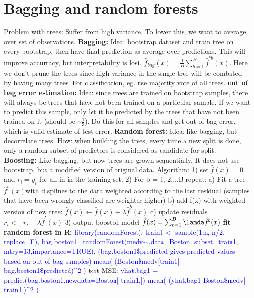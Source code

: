 \section{Bagging and random forests}
Problem with trees: Suffer from high variance. To lower this, we want to average over set of observations. 
\textbf{Bagging: } Idea: bootstrap dataset and train tree on every bootstrap, then have final prediction as average over predictions. This will improve accurracy, but interpretability is lost. $\hat f_{bag}(x)= \frac{1}{B} \sum_{b=1}^B \hat f^{*b}(x)$. Here we don't prune the trees since high variance in the single tree will be combated by having many trees. For classification, eg. use majority vote of all trees.
\textbf{out of bag error estimation: } Idea: since trees are trained on bootstrap samples, there will always be trees that have not been trained on a particular sample. If we want to predict this sample, only let it be predicted by the trees that have not been trained on it (should be \textasciitilde $\frac{1}{3}$). Do this for all samples and get out of bag error, which is valid estimate of test error. 
\textbf{Random forest: } Idea: like bagging, but decorrelate trees. How: when building the trees, every time a new split is done, only a random subset of predictors is considered as candidate for split. 
\textbf{Boosting: } Like bagging, but now trees are grown sequentially. It does not use bootstrap, but a modified version of original data. Algorithm: 
1) set $\hat f(x)$ = 0 and $r_i = y_i$ for all in in the training set.
2) For b = 1, 2...,B repeat:
a) Fit a tree $\hat f^b(x)$with d splines to the data weighted according to the last residual (samples that have been wrongly classified are weighter higher)
b) add f(x) with weighted version of new tree: $ \hat f(x) \leftarrow \hat f(x) + \lambda \hat f^b(x) $
c) update residuals $r_i <- r_i - \lambda \hat f^b(x)$
3) output boosted model $\hat f(x) = \sum_{b=1}^B \lamda \hat f^b(x)$
\textbf{fit random forest in R: } \textcolor{blue}{library(randomForest), train1 <- sample(1:n, n/2, replace=F), bag.boston1=randomForest(medv\textasciitilde .,data=Boston, subset=train1, mtry=13,importance=TRUE), (bag.boston1\$predicted gives predicted values based on out of bag samples) mean( (Boston\$medv[train1]-bag.boston1\$predicted)\^{}2 )} test MSE: \textcolor{blue}{yhat.bag1 = predict(bag.boston1,newdata=Boston[-train1,])
mean( (yhat.bag1-Boston\$medv[-train1])\^{}2 ) }